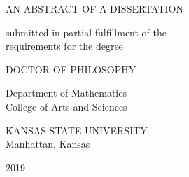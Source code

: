 \begin{center}
   {\large AN ABSTRACT OF A DISSERTATION}\\

   \vspace{0.5cm}
   \begin{singlespace}
   submitted in partial fulfillment of the\\
   requirements for the degree\\
   \end{singlespace}

   \vspace{0.5cm}



   {\large DOCTOR OF PHILOSOPHY}\\
   \vspace{0.5cm}


   \begin{singlespace}
   		Department of Mathematics\\
   College of Arts and Sciences\\
   \end{singlespace}

   \vspace{0.5cm}

   \begin{singlespace}
   {\Large KANSAS STATE UNIVERSITY}\\
   Manhattan, Kansas\\
   \end{singlespace}


   2019\\
   \vspace{1cm}

\end{center}
